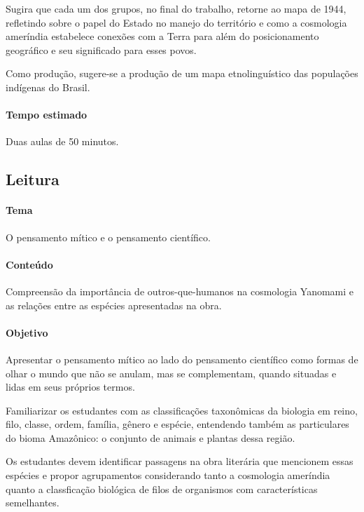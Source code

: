 \documentclass[12pt]{extarticle}
\begin{document}
Sugira que cada um dos grupos, no final do trabalho, retorne ao mapa de 1944, refletindo 
sobre o papel do Estado no manejo do território e como a cosmologia ameríndia estabelece 
conexões com a Terra para além do posicionamento geográfico e seu significado para esses povos.

Como produção, sugere-se a produção de um mapa etnolinguístico das populações indígenas do Brasil.



\paragraph{Tempo estimado} Duas aulas de 50 minutos.


\subsection{Leitura}

\paragraph{Tema} O pensamento mítico e o pensamento científico.

\paragraph{Conteúdo} Compreensão da importância de outros-que-humanos na cosmologia
Yanomami e as relações entre as espécies apresentadas na obra. 

\paragraph{Objetivo} Apresentar o pensamento mítico ao lado do pensamento científico
como formas de olhar o mundo que não se anulam, mas se complementam, quando situadas e 
lidas em seus próprios termos. 

Familiarizar os estudantes com as classificações taxonômicas da biologia em reino, filo, 
classe, ordem, família, gênero e espécie, entendendo também as particulares do bioma 
Amazônico: o conjunto de animais e plantas dessa região.

Os estudantes devem identificar passagens na obra literária que mencionem essas espécies e
propor agrupamentos considerando tanto a cosmologia ameríndia quanto a classficação biológica
de filos de organismos com características semelhantes. 
\end{document}
